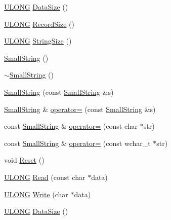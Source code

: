 \begin{DoxyCompactItemize}
\item 
\hyperlink{_basic_excel_8hpp_abe09d1bea023be6a07cbadde8e955435}{U\+L\+O\+N\+G} \hyperlink{struct_y_excel_1_1_small_string_a29a58935661b85f687245ebae82d5dde}{Data\+Size} ()
\item 
\hyperlink{_basic_excel_8hpp_abe09d1bea023be6a07cbadde8e955435}{U\+L\+O\+N\+G} \hyperlink{struct_y_excel_1_1_small_string_adc7d0b59d339495ff727dc599b14f9f9}{Record\+Size} ()
\item 
\hyperlink{_basic_excel_8hpp_abe09d1bea023be6a07cbadde8e955435}{U\+L\+O\+N\+G} \hyperlink{struct_y_excel_1_1_small_string_a8c7553f750a44bb513e221b5755bf0e1}{String\+Size} ()
\item 
\hyperlink{struct_y_excel_1_1_small_string_a5e14f04bfdfcb18ae102a51ca56bb5b9}{Small\+String} ()
\item 
\hyperlink{struct_y_excel_1_1_small_string_ac08fc1975549d73e76f8fede26f7df32}{$\sim$\+Small\+String} ()
\item 
\hyperlink{struct_y_excel_1_1_small_string_a43392143c24f2cc2d638d95c48ec14b7}{Small\+String} (const \hyperlink{struct_y_excel_1_1_small_string}{Small\+String} \&s)
\item 
\hyperlink{struct_y_excel_1_1_small_string}{Small\+String} \& \hyperlink{struct_y_excel_1_1_small_string_ae70da570df610709920937a0af04bb07}{operator=} (const \hyperlink{struct_y_excel_1_1_small_string}{Small\+String} \&s)
\item 
const \hyperlink{struct_y_excel_1_1_small_string}{Small\+String} \& \hyperlink{struct_y_excel_1_1_small_string_a4d0825fa25bf9eded0d9dfd46bf6f584}{operator=} (const char $\ast$str)
\item 
const \hyperlink{struct_y_excel_1_1_small_string}{Small\+String} \& \hyperlink{struct_y_excel_1_1_small_string_ab90adf6ab6c3cc7d6daf0a832445c88f}{operator=} (const wchar\+\_\+t $\ast$str)
\item 
void \hyperlink{struct_y_excel_1_1_small_string_a56c6858401c4fb21fa1bd4dd8c7da420}{Reset} ()
\item 
\hyperlink{_basic_excel_8hpp_abe09d1bea023be6a07cbadde8e955435}{U\+L\+O\+N\+G} \hyperlink{struct_y_excel_1_1_small_string_acd78382b8d66e34bc669b094c4cd52df}{Read} (const char $\ast$data)
\item 
\hyperlink{_basic_excel_8hpp_abe09d1bea023be6a07cbadde8e955435}{U\+L\+O\+N\+G} \hyperlink{struct_y_excel_1_1_small_string_a3ffb2e72c35b0c42eefd218f91241aa1}{Write} (char $\ast$data)
\item 
\hyperlink{_basic_excel_8hpp_abe09d1bea023be6a07cbadde8e955435}{U\+L\+O\+N\+G} \hyperlink{struct_y_excel_1_1_small_string_a29a58935661b85f687245ebae82d5dde}{Data\+Size} ()

\end{DoxyCompactItemize}
